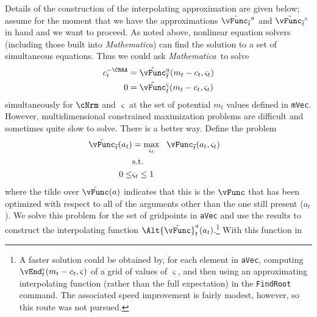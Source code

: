 \documentclass[titlepage, headings=optiontotocandhead]{\econtex}
\newcommand{\Mma}{\textit{Mathematica}}
\begin{document}
Details of the construction of the interpolating approximation are
given below; assume for the moment that we have the approximations
$\hat{\vEOPt}^{{a}}$ and $\hat{\vEOPt}^{\varsigma}$ in
hand and we want to proceed.  As noted above, nonlinear equation
solvers (including those built into {\Mma}) can find the
solution to a set of simultaneous equations.  Thus we could ask
{\Mma}~to solve
\begin{equation}\begin{gathered}\begin{aligned}
      {c}_{t}^{-\CRRA}  & = \hat{\vFunc}^{a}_{\overline{t}}({m}_{t}-{c}_{t},\varsigma_{t}) %
      \\      0  & = \hat{\vFunc}^{\varsigma}_{\bar{t}}({m}_{t}-{c}_{t},\varsigma_{t}) \label{eq:FOCwrtw}
    \end{aligned}\end{gathered}\end{equation}
simultaneously for $\cNrm$ and $\varsigma$ at the set of potential ${m}_{t}$ values defined in
\texttt{mVec}. However, multidimensional constrained
maximization problems are difficult and sometimes quite slow to
solve.  There is a better way.  Define the problem
\providecommand{\Opt}{}
\renewcommand{\Opt}{\tilde}
\providecommand{\vOpt}{}
\renewcommand{\vOpt}{\overset{*}{\vFunc}}
\begin{equation}\begin{gathered}\begin{aligned}
      \Opt{\vFunc}_{\overline{t}}({a}_{t})  & = \max_{\varsigma_{t}} ~~  \vEOPt({a}_{t},\varsigma_{t})
      \\      & \text{s.t.} & \nonumber
      \\      0 \leq & \varsigma_{t} \leq 1
    \end{aligned}\end{gathered}\end{equation}
where the tilde over $\Opt{\vFunc}(a)$ indicates that this is the $\vFunc$ that has been optimized with
respect to all of the arguments other than the one still present
(${a}_{t}$).  We solve this problem for the set of gridpoints in
\texttt{aVec} and use the results to construct the interpolating
function $\Alt{\Opt{\vFunc}}_{t}^{a}({a}_{t})$.\footnote{A faster solution
  could be obtained by, for each element in \texttt{aVec}, computing
  $\vEnd^{\varsigma}_{t}({m}_{t}-{c}_{t},\varsigma)$ of a grid of
  values of $\varsigma$, and then using an approximating interpolating
  function (rather than the full expectation) in the \texttt{FindRoot}
  command.  The associated speed improvement is fairly modest,
  however, so this route was not pursued.}  With this function in
\end{document}
